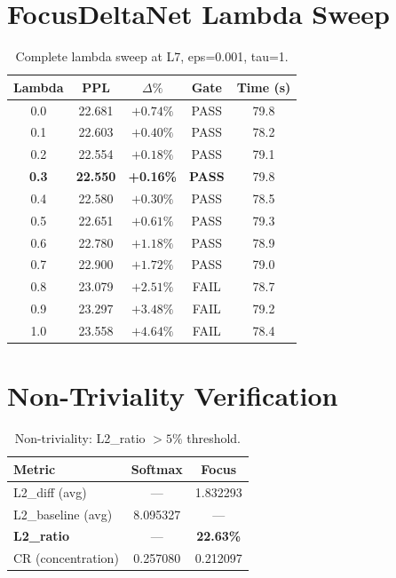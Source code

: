 \documentclass[11pt]{article}
\begin{document}
\section{FocusDeltaNet Lambda Sweep}

\begin{table}[h]
\centering
\begin{tabular}{ccccc}
\toprule
Lambda & PPL & $\Delta\%$ & Gate & Time (s) \\
\midrule
0.0 & 22.681 & $+0.74\%$ & PASS & 79.8 \\
0.1 & 22.603 & $+0.40\%$ & PASS & 78.2 \\
0.2 & 22.554 & $+0.18\%$ & PASS & 79.1 \\
\textbf{0.3} & \textbf{22.550} & \textbf{+0.16\%} & \textbf{PASS} & 79.8 \\
0.4 & 22.580 & $+0.30\%$ & PASS & 78.5 \\
0.5 & 22.651 & $+0.61\%$ & PASS & 79.3 \\
0.6 & 22.780 & $+1.18\%$ & PASS & 78.9 \\
0.7 & 22.900 & $+1.72\%$ & PASS & 79.0 \\
0.8 & 23.079 & $+2.51\%$ & FAIL & 78.7 \\
0.9 & 23.297 & $+3.48\%$ & FAIL & 79.2 \\
1.0 & 23.558 & $+4.64\%$ & FAIL & 78.4 \\
\bottomrule
\end{tabular}
\caption{Complete lambda sweep at L7, eps=0.001, tau=1.}
\end{table}

\section{Non-Triviality Verification}

\begin{table}[h]
\centering
\begin{tabular}{lcc}
\toprule
Metric & Softmax & Focus \\
\midrule
L2\_diff (avg) & --- & 1.832293 \\
L2\_baseline (avg) & 8.095327 & --- \\
\textbf{L2\_ratio} & --- & \textbf{22.63\%} \\
CR (concentration) & 0.257080 & 0.212097 \\
\bottomrule
\end{tabular}
\caption{Non-triviality: L2\_ratio $> 5\%$ threshold.}
\end{table}
\end{document}
